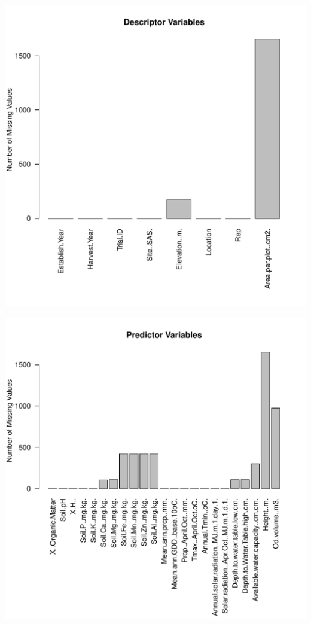 \documentclass{article}\usepackage[]{graphicx}\usepackage[]{color}
\makeatletter
\def\maxwidth{ %
  \ifdim\Gin@nat@width>\linewidth
    \linewidth
  \else
    \Gin@nat@width
  \fi
}
\newenvironment{knitrout}{}{} %
\makeatother
\begin{document}
  
\begin{knitrout}
\color{fgcolor}

{\centering \includegraphics[width=\maxwidth]{figure/MissingValuesPredictorGroup-1} 

}




{\centering \includegraphics[width=\maxwidth]{figure/MissingValuesPredictorGroup-2} 

}
\end{knitrout}
\end{document}
